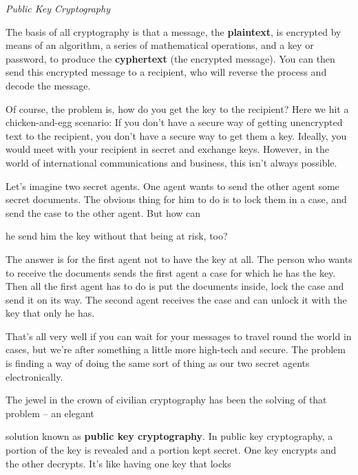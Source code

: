 \documentclass[a4paper,11pt]{book}
\begin{document}
\noindent \textit{Public Key Cryptography}

\noindent The basis of all cryptography is that a message, the \textbf{plaintext}, is encrypted by means of an algorithm, a series of mathematical operations, and a key or password, to produce the \textbf{cyphertext }(the encrypted message). You can then send this encrypted message to a recipient, who will reverse the process and decode the message.

\noindent 

\noindent Of course, the problem is, how do you get the key to the recipient? Here we hit a chicken-and-egg scenario: If you don't have a secure way of getting unencrypted text to the recipient, you don't have a secure way to get them a key. Ideally, you would meet with your recipient in secret and exchange keys. However, in the world of international communications and business, this isn't always possible.

\noindent 

\noindent Let's imagine two secret agents. One agent wants to send the other agent some secret documents. The obvious thing for him to do is to lock them in a case, and send the case to the other agent. But how can

\noindent he send him the key without that being at risk, too?

\noindent 

\noindent The answer is for the first agent not to have the key at all. The person who wants to receive the documents sends the first agent a case for which he has the key. Then all the first agent has to do is put the documents inside, lock the case and send it on its way. The second agent receives the case and can unlock it with the key that only he has.

\noindent 

\noindent That's all very well if you can wait for your messages to travel round the world in cases, but we're after something a little more high-tech and secure. The problem is finding a way of doing the same sort of thing as our two secret agents electronically.

\noindent 

\noindent The jewel in the crown of civilian cryptography has been the solving of that problem -- an elegant

\noindent solution known as \textbf{public key cryptography}. In public key cryptography, a portion of the key is revealed and a portion kept secret. One key encrypts and the other decrypts. It's like having one key that locks
\end{document}
